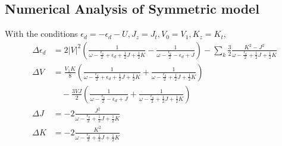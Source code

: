 \documentclass[12pt,twoside]{article}
\numberwithin{equation}{section}
\begin{document}
{\subsection{Numerical Analysis of Symmetric model}
With the conditions \(\epsilon_d = -\epsilon_d - U, J_z = J_t, V_0 = V_1, K_z = K_t\),
\begin{equation}\begin{aligned}
	\Delta \epsilon_d &= 2|V|^2 \left(\frac{1}{\omega - \frac{\epsilon_q}{2} + \epsilon_d + \frac{1}{2}J + \frac{1}{2}K}  - \frac{1}{\omega - \frac{\epsilon_q}{2} - \epsilon_d + J}\right) - \sum_k \frac{3}{2}\frac{K^2 - J^2}{\omega - \frac{\epsilon_q}{2} + \frac{1}{2}J + \frac{1}{2}K} \\
	\Delta V &= \frac{V_1 K}{8}\left( \frac{1}{\omega - \frac{\epsilon_q}{2} + \epsilon_d + \frac{1}{2}J + \frac{1}{2}K} + \frac{1}{\omega - \frac{\epsilon_q}{2} + \frac{1}{2}J + \frac{1}{2}K} \right) \\
		 &\quad- \frac{3VJ}{2}\left( \frac{1}{\omega - \frac{\epsilon_q}{2} - \epsilon_d + J} + \frac{1}{\omega - \frac{\epsilon_q}{2} + \frac{1}{2}J + \frac{1}{2}K} \right) \\
	\Delta J &= - 2 \frac{J^2}{\omega - \frac{\epsilon_q}{2} + \frac{1}{2}J + \frac{1}{2}K}\\
	\Delta K &= - 2 \frac{K^2}{\omega - \frac{\epsilon_q}{2} + \frac{1}{2}J + \frac{1}{2}K}\\
\end{aligned}\end{equation}
}
\end{document}
